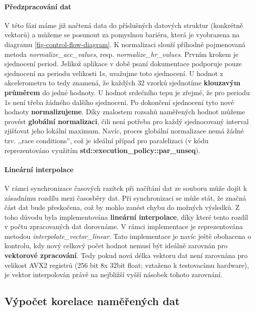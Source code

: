\documentclass[12pt, a4paper]{article}
\begin{document}
\paragraph{Předzpracování dat} V této fázi máme již načtená data do příslušných datových struktur (konkrétně vektorů) a můžeme se posunout za pomyslnou bariéru, která je vyobrazena na diagramu \ref{fig-control-flow-diagram}.  
K normalizaci slouží příhodně pojmenovaná metoda \textit{normalize\_acc\_values}, resp. \textit{normalize\_hr\_values}.
Prvním krokem je sjednocení period. 
Jelikož aplikace v době psaní dokumentace podporuje pouze sjednocení na periodu velikosti 1s, uvažujme toto sjednocení.
U hodnot z akcelerometru to tedy znamená, že každých 32 vzorků sjednotíme \textbf{klouzavým průměrem} do jedné hodnoty. 
U hodnot srdečního tepu je zřejmé, že pro periodu 1s není třeba žádného dalšího sjednocení. 
Po dokončení sjednocení tyto nové hodnoty \textbf{normalizujeme}. 
Díky znalostem rozsahů naměřených hodnot můžeme provést \textbf{globální normalizaci}, čili není potřeba pro každý sjednocovaný interval zjišťovat jeho lokální maximum. 
Navíc, proces globální normalizace nemá žádné tzv. ,,race conditions'', což je ideální případ pro paralelizaci (v kódu reprezentováno využitím \textbf{std::execution\_policy::par\_unseq}).

\paragraph{Lineární interpolace} V rámci synchronizace časových razítek při načítání dat ze souboru může dojít k zásadnímu rozdílu mezi časosběry dat.
Při synchronizaci se může stát, že značná část dat bude přeskočena, což by mohlo zanést chybu do možných výsledků.
Z toho důvodu byla implementována \textbf{lineární interpolace}, díky které tento rozdíl v počtu zpracovaných dat dorovnáme. 
V rámci implementace je reprezentována metodou \textit{interpolate\_vector\_linear}. 
Tato implementace je navíc ještě obohacena o kontrolu, kdy nový celkový počet hodnot nemusí být ideálně zarovnán pro \textbf{vektorové zpracování}.
Tedy pokud nová délka vektoru dat není zarovnána pro velikost AVX2 registrů (256 bit \textrightarrow 8x 32bit float; vztaženo k testovacímu hardware), je vektor interpolován právě na nejbližší vyšší násobek tohoto zarovnání.

\subsection{Výpočet korelace naměřených dat}
\end{document}
